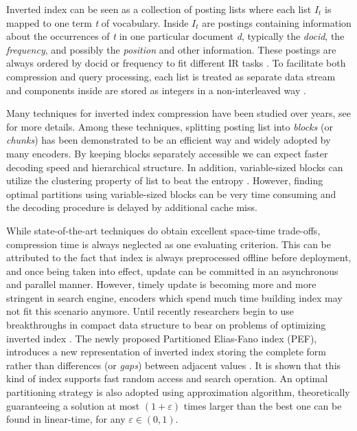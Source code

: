\documentclass[runningheads,a4paper]{llncs}
\begin{document}
Inverted index can be seen as a collection of posting lists where each list $I_t$ is mapped to one term \textit{t} of vocabulary.
Inside $I_t$ are postings containing information about the occurrences of \textit{t} in one particular document \textit{d}, typically the \textit{docid}, the \textit{frequency}, and possibly the \textit{position} and other information.
These postings are always ordered by docid or frequency to fit different IR tasks \cite{navarro2010dual}.
To facilitate both compression and query processing, each list is treated as separate data stream and components inside are stored as integers in a non-interleaved way \cite{anh2010index}.

Many techniques for inverted index compression have been studied over years, see \cite{catena2014inverted,trotman2014compression} for more details.
Among these techniques, splitting posting list into \textit{blocks} (or \textit{chunks}) has been demonstrated to be an efficient way and widely adopted by many encoders.
By keeping blocks separately accessible we can expect faster decoding speed and hierarchical structure.
In addition, variable-sized blocks can utilize the clustering property of list to beat the entropy \cite{silvestri2010vsencoding,moffat2000binary}.
However, finding optimal partitions using variable-sized blocks can be very time consuming and the decoding procedure is delayed by additional cache miss.

While state-of-the-art techniques do obtain excellent space-time trade-offs, compression time is always neglected as one evaluating criterion.
This can be attributed to the fact that index is always preprocessed offline before deployment, and once being taken into effect, update can be committed in an asynchronous and parallel manner.
However, timely update is becoming more and more stringent in search engine, encoders which spend much time building index may not fit this scenario anymore.
Until recently researchers begin to use breakthroughs in compact data structure to bear on problems of optimizing inverted index \cite{navarro2010dual,petri2014score}.
The newly proposed Partitioned Elias-Fano index (PEF), introduces a new representation of inverted index storing the complete form rather than differences (or \textit{gaps}) between adjacent values \cite{ottaviano2014partitioned,vigna2013quasi}.
It is shown that this kind of index supports fast random access and search operation.
An optimal partitioning strategy is also adopted using approximation algorithm, theoretically guaranteeing a solution at most $\left(1+\varepsilon\right)$ times larger than the best one can be found in linear-time, for any $ \varepsilon \in \left(0, 1\right) $.
\end{document}
